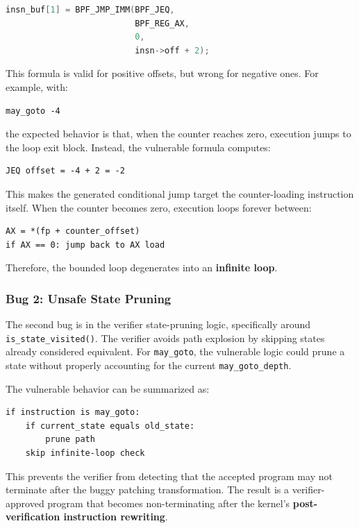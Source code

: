 \documentclass[../main.tex]{subfiles}
\begin{document}
\begin{lstlisting}[language=C, caption={Vulnerable offset calculation.}]
insn_buf[1] = BPF_JMP_IMM(BPF_JEQ,
                          BPF_REG_AX,
                          0,
                          insn->off + 2);
\end{lstlisting}

This formula is valid for positive offsets, but wrong for negative ones. For example, with:

\begin{lstlisting}
may_goto -4
\end{lstlisting}

the expected behavior is that, when the counter reaches zero, execution jumps to the loop exit block. Instead, the vulnerable formula computes:

\begin{lstlisting}
JEQ offset = -4 + 2 = -2
\end{lstlisting}

This makes the generated conditional jump target the counter-loading instruction itself. When the counter becomes zero, execution loops forever between:

\begin{lstlisting}
AX = *(fp + counter_offset)
if AX == 0: jump back to AX load
\end{lstlisting}

Therefore, the bounded loop degenerates into an \textbf{infinite loop}.

\subsubsection{Bug 2: Unsafe State Pruning}

The second bug is in the verifier state-pruning logic, specifically around \texttt{is\_state\_visited()}. The verifier avoids path explosion by skipping states already considered equivalent. For \texttt{may\_goto}, the vulnerable logic could prune a state without properly accounting for the current \texttt{may\_goto\_depth}.

The vulnerable behavior can be summarized as:

\begin{lstlisting}[caption={Simplified vulnerable pruning logic.}]
if instruction is may_goto:
    if current_state equals old_state:
        prune path
    skip infinite-loop check
\end{lstlisting}

This prevents the verifier from detecting that the accepted program may not terminate after the buggy patching transformation. The result is a verifier-approved program that becomes non-terminating after the kernel's \textbf{post-verification instruction rewriting}.
\end{document}

